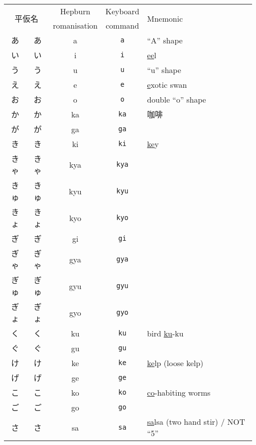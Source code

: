 \documentclass[../nihongo-gakushuu-kyouzai.tex]{subfiles}
\begin{document}
\begin{longtable}[c]{@{}ccccl@{}}
    \toprule
    \multicolumn{2}{c}{\multirow{2}{*}{平仮名}} & Hepburn & Keyboard & \multirow{2}{*}{Mnemonic} \\
    \multicolumn{2}{c}{} & romanisation & command & \\* \midrule
    あ & {\sffamily あ} & a & \texttt{a} & ``A'' shape \\
    い & {\sffamily い} & i & \texttt{i} & \ul{ee}l \\
    う & {\sffamily う} & u & \texttt{u} & ``u'' shape \\
    え & {\sffamily え} & e & \texttt{e} & \ul{e}xotic swan \\
    お & {\sffamily お} & o & \texttt{o} & double ``o'' shape \\
    か & {\sffamily か} & ka & \texttt{ka} & 咖啡 \\
    が & {\sffamily が} & ga & \texttt{ga} &  \\
    き & {\sffamily き} & ki & \texttt{ki} & \ul{ke}y \\
    きゃ & {\sffamily きゃ} & kya & \texttt{kya} &  \\
    きゅ & {\sffamily きゅ} & kyu & \texttt{kyu} &  \\
    きょ & {\sffamily きょ} & kyo & \texttt{kyo} &  \\
    ぎ & {\sffamily ぎ} & gi & \texttt{gi} &  \\
    ぎゃ & {\sffamily ぎゃ} & gya & \texttt{gya} &  \\
    ぎゅ & {\sffamily ぎゅ} & gyu & \texttt{gyu} &  \\
    ぎょ & {\sffamily ぎょ} & gyo & \texttt{gyo} &  \\
    く & {\sffamily く} & ku & \texttt{ku} & bird \ul{ku}-ku \\
    ぐ & {\sffamily ぐ} & gu & \texttt{gu} &  \\
    け & {\sffamily け} & ke & \texttt{ke} & \ul{ke}lp (loose kelp) \\
    げ & {\sffamily げ} & ge & \texttt{ge} &  \\
    こ & {\sffamily こ} & ko & \texttt{ko} & \ul{co}-habiting worms \\
    ご & {\sffamily ご} & go & \texttt{go} &  \\
    さ & {\sffamily さ} & sa & \texttt{sa} & \ul{sa}lsa (two hand stir) / NOT ``5'' \\

\end{longtable}
\end{document}
